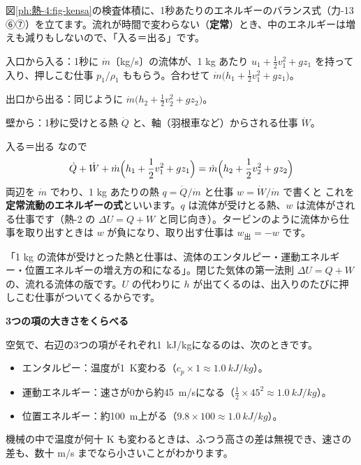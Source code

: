 

\leavevmode\label{ph:熱-4:sec3}図\ref{ph:熱-4:fig-kensa}の検査体積に、1秒あたりのエネルギーのバランス式（力-13 ⑥⑦）を立てます。流れが時間で変わらない（\textbf{定常}）とき、中のエネルギーは増えも減りもしないので、「入る＝出る」です。
\begin{enumerate}[label={\bkcircled[bkBlue]{\arabic*}}, leftmargin=2.4\zw, itemsep=2pt, topsep=2pt]
\item 入口から入る：1秒に $\dot m$〔kg/s〕の流体が、1 kg あたり $u_1+\tfrac12v_1^2+gz_1$ を持って入り、押しこむ仕事 $p_1/\rho_1$ ももらう。合わせて $\dot m\bigl(h_1+\tfrac12v_1^2+gz_1\bigr)$。
\item 出口から出る：同じように $\dot m\bigl(h_2+\tfrac12v_2^2+gz_2\bigr)$。
\item 壁から：1秒に受けとる熱 $\dot Q$ と、軸（羽根車など）からされる仕事 $\dot W$。
\end{enumerate}
入る＝出る なので
\[ \dot Q+\dot W+\dot m\Bigl(h_1+\frac12v_1^2+gz_1\Bigr)=\dot m\Bigl(h_2+\frac12v_2^2+gz_2\Bigr) \]
両辺を $\dot m$ でわり、1 kg あたりの熱 $q=\dot Q/\dot m$ と仕事 $w=\dot W/\dot m$ で書くと
\label{ph:熱-4:sfee}これを\textbf{定常流動のエネルギーの式}といいます。$q$ は流体が受けとる熱、$w$ は流体がされる仕事です（熱-2 の $\Delta U=Q+W$ と同じ向き）。タービンのように流体から仕事を取り出すときは $w$ が負になり、取り出す仕事は $w_{\text{出}}=-w$ です。

\begin{phyomi}[$q+w=\Delta h+\Delta(\tfrac12v^2)+g\Delta z$]
「1 kg の流体が受けとった熱と仕事は、流体のエンタルピー・運動エネルギー・位置エネルギーの増え方の和になる」。閉じた気体の第一法則 $\Delta U=Q+W$ の、流れる流体の版です。$U$ の代わりに $h$ が出てくるのは、出入りのたびに押しこむ仕事がついてくるからです。
\end{phyomi}

\noindent\textbf{3つの項の大きさをくらべる}\par\nobreak
空気で、右辺の3つの項がそれぞれ\qty{1}{kJ/kg}になるのは、次のときです。
\begin{itemize}[leftmargin=1.2\zw, itemsep=2pt, topsep=2pt, label={\color{bkTheme}●}]
\item エンタルピー：温度が\qty{1}{K}変わる（$c_p\times1\approx\qty{1.0}{kJ/kg}$）。
\item 運動エネルギー：速さが0から約\qty{45}{m/s}になる（$\tfrac12\times45^2\approx\qty{1.0}{kJ/kg}$）。
\item 位置エネルギー：約\qty{100}{m}上がる（$9.8\times100\approx\qty{1.0}{kJ/kg}$）。
\end{itemize}
機械の中で温度が何十 K も変わるときは、ふつう高さの差は無視でき、速さの差も、数十 m/s までなら小さいことがわかります。

